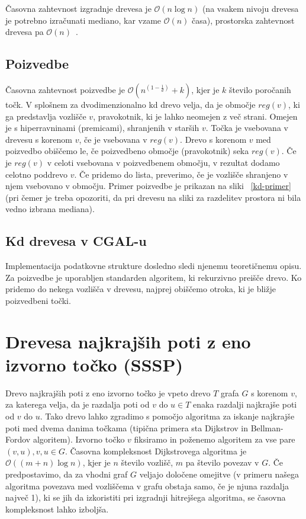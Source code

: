 \documentclass[a4paper, 12pt]{book}
\newcommand{\OO}{\ensuremath{\mathcal{O}}} %
\begin{document}
Časovna zahtevnost izgradnje drevesa je $\OO(n\log n)$ (na vsakem nivoju drevesa je potrebno izračunati mediano, kar vzame $\OO(n)$ časa), prostorska zahtevnost drevesa pa $\OO(n)$~\cite{bkos-08-kd}.
\subsection{Poizvedbe}
Časovna zahtevnost poizvedbe je $\OO(n^{(1-\frac{1}{d})} + k)$, kjer je $k$ število poročanih točk. V splošnem za dvodimenzionalno kd drevo velja, da je območje $reg(v)$, ki ga predstavlja vozlišče $v$, pravokotnik, ki je lahko neomejen z več strani. Omejen je s hiperravninami (premicami), shranjenih v starših $v$. Točka je vsebovana v drevesu s korenom $v$, če je vsebovana v $reg(v)$. Drevo s korenom $v$ med poizvedbo obiščemo le, če poizvedbeno območje (pravokotnik) seka $reg(v)$. Če
je $reg(v)$ v celoti vsebovana v poizvedbenem območju, v rezultat dodamo celotno poddrevo $v$. Če pridemo do lista, preverimo, če je vozlišče shranjeno v njem vsebovano v območju. Primer poizvedbe je prikazan na sliki ~\ref{kd-primer} (pri čemer je treba opozoriti, da pri drevesu na sliki za razdelitev prostora ni bila vedno izbrana mediana).

\subsection{Kd drevesa v CGAL-u}
Implementacija podatkovne strukture dosledno sledi njenemu teoretičnemu opisu. Za poizvedbe je uporabljen standarden algoritem, ki rekurzivno preišče drevo. Ko pridemo do nekega vozlišča v drevesu, najprej obiščemo otroka, ki je bližje poizvedbeni točki. 

\section{Drevesa najkrajših poti z eno izvorno točko (SSSP)}
Drevo najkrajših poti z eno izvorno točko je vpeto drevo $T$ grafa $G$ s korenom $v$, za katerega velja, da je razdalja poti od $v$ do $u \in T$ enaka razdalji najkrajše poti od $v$ do $u$. Tako drevo lahko zgradimo s pomočjo algoritma za iskanje najkrajše poti med dvema danima točkama (tipična primera sta Dijkstrov in Bellman-Fordov algoritem). Izvorno točko $v$ fiksiramo in poženemo algoritem za vse pare $(v, u), v,u \in G.$ Časovna kompleksnost Dijkstrovega algoritma je $\OO((m+n)\log n)$, kjer je $n$ število vozlišč, $m$ pa število povezav v $G$. Če predpostavimo, da za vhodni graf $G$ veljajo določene omejitve (v primeru našega algoritma povezava med vozliščema v grafu obstaja samo, če je njuna razdalja največ 1), ki se jih da izkoristiti pri izgradnji hitrejšega algoritma, se časovna kompleksnost lahko izboljša.
\end{document}
